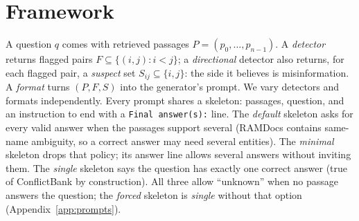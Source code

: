 \section{Framework}
\label{sec:method}

A question $q$ comes with retrieved passages $P=(p_0,\dots,p_{n-1})$. A \emph{detector} returns flagged pairs
$F\subseteq\{(i,j): i<j\}$; a \emph{directional} detector also returns, for each flagged pair, a \emph{suspect}
set $S_{ij}\subseteq\{i,j\}$: the side it believes is misinformation. A \emph{format} turns $(P,F,S)$ into the
generator's prompt. We vary detectors and formats independently. Every prompt shares a skeleton: passages, question,
and an instruction to end with a \texttt{Final answer(s):} line. The \emph{default} skeleton asks for every valid
answer when the passages support several (RAMDocs contains same-name ambiguity, so a correct answer may need several
entities). The \emph{minimal} skeleton drops that policy; its answer line allows several answers without inviting
them. The \emph{single} skeleton says the question has exactly one correct answer (true of ConflictBank by
construction). All three allow ``unknown'' when no passage answers the question; the \emph{forced} skeleton is
\emph{single} without that option (Appendix~\ref{app:prompts}).

